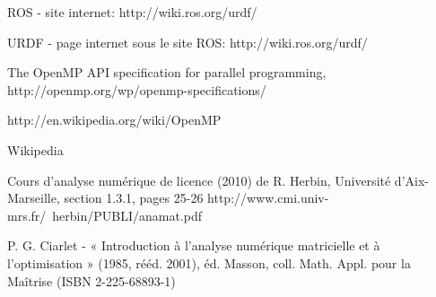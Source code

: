\begin{thebibliography}{9}



  ROS - site internet:
  http://wiki.ros.org/urdf/

  URDF - page internet sous le site ROS:
  http://wiki.ros.org/urdf/




  The OpenMP API specification for parallel programming,
  http://openmp.org/wp/openmp-specifications/

  http://en.wikipedia.org/wiki/OpenMP
  
  Wikipedia%

  Cours d'analyse numérique de licence (2010) de R. Herbin, Université d'Aix-Marseille, section 1.3.1, pages 25-26
  http://www.cmi.univ-mrs.fr/~herbin/PUBLI/anamat.pdf
  
  P. G. Ciarlet - « Introduction à l'analyse numérique matricielle et à l'optimisation » (1985, rééd. 2001), éd. Masson, coll. Math. Appl. pour la Maîtrise (ISBN 2-225-68893-1)

  

  
\end{thebibliography}
